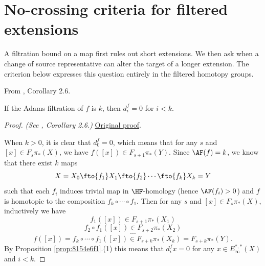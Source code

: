 \section{No-crossing criteria for filtered extensions}

A filtration bound on a map first rules out short extensions. We then
ask when a change of source representative can alter the target of a
longer extension. The criterion below expresses this question entirely
in the filtered homotopy groups.

\begin{corollary}
\label{paper:2.6}
From \cite{LWX126}, Corollary 2.6.\par

If the Adams filtration of $f$ is $k$, then
    $d^f_i=0$ for $i<k$.


\end{corollary}
\begin{proof}
\textit{(See \cite{LWX126}, Corollary 2.6.)} \href{paper/main.tex.html#L332}{Original proof}.

When $k>0$, it is clear that $d^f_0=0$, which means that for any $s$ and $[x]\in F_s\pi_*(X)$, we have $f([x])\in F_{s+1}\pi_*(Y)$. Since $\AF(f)=k$, we know that there exist $k$ maps
    $$X=X_0\fto{f_1}X_1\fto{f_2}\cdots\fto{f_k}X_k=Y$$
    such that each $f_i$ induces trivial map in $\HF$-homology (hence $\AF(f_i)>0$) and $f$ is homotopic to the composition $f_k\circ \cdots\circ f_1.$
    Then for any $s$ and $[x]\in F_s\pi_*(X)$, inductively we have
    $$f_1([x])\in F_{s+1}\pi_*(X_1)$$
    $$f_2\circ f_1([x])\in F_{s+2}\pi_*(X_2)$$
    $$\cdots$$
    $$f([x])=f_k\circ\cdots\circ f_1([x])\in F_{s+k}\pi_*(X_k)=F_{s+k}\pi_*(Y).$$
    By Proposition \ref{prop:8154e6f1}.(1) this means that $d_i^fx=0$ for any $x\in E_\infty^{*,*}(X)$ and $i<k$.
\end{proof}

